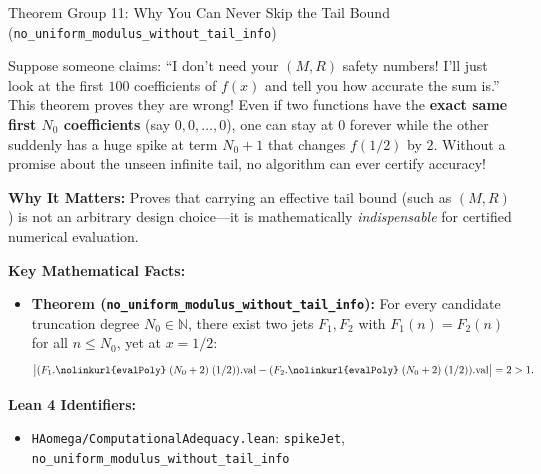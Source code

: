 \documentclass[11pt,a4paper]{article}
\newcommand{\N}{\ensuremath{\mathbb{N}}}
\newcommand{\lean}[1]{\texttt{\nolinkurl{#1}}}
\begin{document}
\vspace{6pt}

\begin{thmcard}{Theorem Group 11: Why You Can Never Skip the Tail Bound (\lean{no\_uniform\_modulus\_without\_tail\_info})}
\begin{eli5box}
Suppose someone claims: ``I don't need your $(M, R)$ safety numbers! I'll just look at the first $100$ coefficients of $f(x)$ and tell you how accurate the sum is.'' This theorem proves they are wrong! Even if two functions have the \textbf{exact same first $N_0$ coefficients} (say $0, 0, \dots, 0$), one can stay at $0$ forever while the other suddenly has a huge spike at term $N_0 + 1$ that changes $f(1/2)$ by $2$. Without a promise about the unseen infinite tail, no algorithm can ever certify accuracy!
\end{eli5box}

\textbf{Why It Matters:}
Proves that carrying an effective tail bound (such as $(M, R)$) is not an arbitrary design choice---it is mathematically \emph{indispensable} for certified numerical evaluation.

\textbf{Key Mathematical Facts:}
\begin{itemize}
  \item \textbf{Theorem (\lean{no_uniform_modulus_without_tail_info}):} For every candidate truncation degree $N_0 \in \N$, there exist two jets $F_1, F_2$ with $F_1(n) = F_2(n)$ for all $n \le N_0$, yet at $x = 1/2$:
  \[
    \bigl|(F_1.\lean{evalPoly}\;(N_0+2)\;(1/2)).\mathrm{val} - (F_2.\lean{evalPoly}\;(N_0+2)\;(1/2)).\mathrm{val}\bigr| = 2 > 1.
  \]
\end{itemize}

\textbf{Lean 4 Identifiers:}
\begin{itemize}
  \item \lean{HAomega/ComputationalAdequacy.lean}: \lean{spikeJet}, \lean{no_uniform_modulus_without_tail_info}
\end{itemize}
\end{thmcard}

\vspace{6pt}
\end{document}
